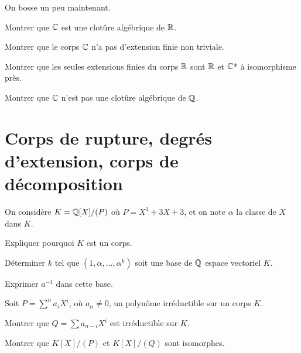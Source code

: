 \documentclass[french]{report}
\begin{document}
\begin{exo} On bosse un peu maintenant.
    \begin{q}{1}
        Montrer que \(\mathbb{C}\) est une clotûre algébrique de \(\mathbb{R}\).
    \end{q}
    \begin{q}{2}
        Montrer que le corps \(\mathbb{C}\) n'a pas d'extension finie non triviale.
    \end{q}
    \begin{q}{3}
        Montrer que les seules extensions finies du corps \(\mathbb{R}\) sont \(\mathbb{R}\) et \(\mathbb{C}\)*
        à isomorphisme près.
    \end{q}
    \begin{q}{4}
        Montrer que \(\mathbb{C}\) n'est pas une clotûre algébrique de \(\mathbb{Q}\).
    \end{q}
\end{exo}

\section*{Corps de rupture, degrés d'extension, corps de décomposition}

\begin{exo}
    On considère \(K=\mathbb{Q}[X]/(P)\) où \(P=X^3+3X+3\), et on note \(\alpha\)
    la classe de \(X\) dans \(K\).
    \begin{q}{1}
        Expliquer pourquoi \(K\) est un corps.
    \end{q}
    \begin{q}{2}
        Déterminer \(k\) tel que \(\left(1,\alpha,\dots,\alpha^k\right)\) soit
        une base de \(\mathbb{Q}\) espace vectoriel \(K\).
    \end{q}
    \begin{q}{3}
        Exprimer \(a^{-1}\) dans cette base.
    \end{q}
\end{exo}

\begin{exo}
    Soit \(P=\sum^n a_iX^i\), où \(a_n\neq0\), un polynôme irréductible sur un corps \(K\).
    \begin{q}{1}
        Montrer que \(Q = \sum a_{n-i}X^i\) est irréductible sur \(K\).
    \end{q}
    \begin{q}{2}
        Montrer que \(K[X]/(P)\) et \(K[X]/(Q)\) sont isomorphes.
    \end{q}
\end{exo}
\end{document}
